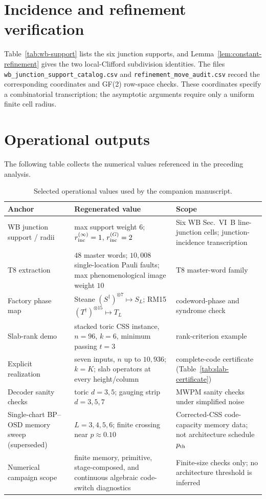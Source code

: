 \documentclass[aps,prx,reprint,superscriptaddress,nofootinbib,floatfix,longbibliography]{revtex4-2}
\theoremstyle{definition}
\begin{document}
\section{Incidence and refinement verification}\label{sec:incidence-refinement}
\label{sec:wb-support-reconstruction}\label{sec:refinement-certificate}
Table~\ref{tab:wb-support} lists the six junction supports, and
Lemma~\ref{lem:constant-refinement} gives the two local-Clifford subdivision
identities. The files \nolinkurl{wb_junction_support_catalog.csv} and
\nolinkurl{refinement_move_audit.csv} record the corresponding coordinates
and GF(2) row-space checks. These coordinates specify a combinatorial
transcription; the asymptotic arguments require only a uniform finite cell radius.
\section{Operational outputs}
\label{sec:supp-operational}

The following table collects the numerical values referenced in the preceding analysis.

\begin{table}[t]
\caption{Selected operational values used by the companion manuscript.}
\label{tab:supp-operational-summary}
\scriptsize
\setlength{\tabcolsep}{5pt}
\renewcommand{\arraystretch}{1.12}
\begin{tabular}{@{}p{3.3cm}p{4.1cm}p{8.0cm}@{}}
\toprule
Anchor & Regenerated value & Scope \\
\midrule
WB junction support / radii & max support weight $6$; $r_{\rm inc}^{(\infty)}=1$, $r_{\rm inc}^{(G)}=2$ & Six WB Sec.~VI~B line-junction cells; junction-incidence transcription \\
T8 extraction & $48$ master words; $10{,}008$ single-location Pauli faults; max phenomenological image weight $10$ & T8 master-word family \\
Factory phase map & Steane $(S^\dagger)^{\otimes7}\mapsto S_L$; RM15 $(T^\dagger)^{\otimes15}\mapsto T_L$ & codeword-phase and syndrome check \\
Slab-rank demo & stacked toric CSS instance, $n=96$, $k=6$, minimum passing $t=3$ & rank-criterion example \\
Explicit realization & seven inputs, $n$ up to $10{,}936$; $k=K$; slab operators at every height/column & complete-code certificate (Table~\ref{tab:slab-certificate}) \\
Decoder sanity checks & toric $d=3,5$; gauging strip $d=3,5,7$ & MWPM sanity checks under simplified noise \\
Single-chart BP--OSD memory sweep (superseded) & $L=3,4,5,6$; finite crossing near $p\approx0.10$ & Corrected-CSS code-capacity memory data; not architecture schedule $p_{\rm th}$ \\
Numerical campaign scope & finite memory, primitive, stage-composed, and continuous algebraic code-switch diagnostics & Finite-size checks only; no architecture threshold is inferred \\
\bottomrule
\end{tabular}
\end{table}
\end{document}
